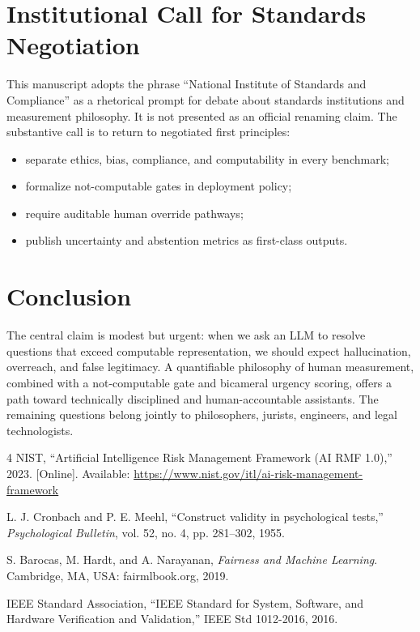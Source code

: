 \documentclass[conference]{IEEEtran}
\begin{document}
\section{Institutional Call for Standards Negotiation}
This manuscript adopts the phrase ``National Institute of Standards and Compliance'' as a rhetorical prompt for debate about standards institutions and measurement philosophy. It is not presented as an official renaming claim. The substantive call is to return to negotiated first principles:
\begin{itemize}
    \item separate ethics, bias, compliance, and computability in every benchmark;
    \item formalize not-computable gates in deployment policy;
    \item require auditable human override pathways;
    \item publish uncertainty and abstention metrics as first-class outputs.
\end{itemize}

\section{Conclusion}
The central claim is modest but urgent: when we ask an LLM to resolve questions that exceed computable representation, we should expect hallucination, overreach, and false legitimacy. A quantifiable philosophy of human measurement, combined with a not-computable gate and bicameral urgency scoring, offers a path toward technically disciplined and human-accountable assistants. The remaining questions belong jointly to philosophers, jurists, engineers, and legal technologists.


\begin{thebibliography}{4}
NIST, ``Artificial Intelligence Risk Management Framework (AI RMF 1.0),'' 2023. [Online]. Available: \url{https://www.nist.gov/itl/ai-risk-management-framework}

L. J. Cronbach and P. E. Meehl, ``Construct validity in psychological tests,'' \emph{Psychological Bulletin}, vol. 52, no. 4, pp. 281--302, 1955.

S. Barocas, M. Hardt, and A. Narayanan, \emph{Fairness and Machine Learning}. Cambridge, MA, USA: fairmlbook.org, 2019.

IEEE Standard Association, ``IEEE Standard for System, Software, and Hardware Verification and Validation,'' IEEE Std 1012-2016, 2016.
\end{thebibliography}
\end{document}
